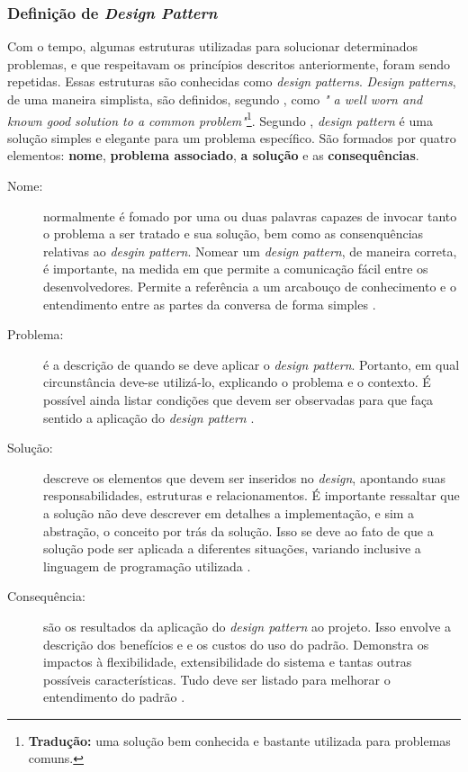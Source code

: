 \subsubsection{Definição de \textit{Design Pattern}}
Com o tempo, algumas estruturas utilizadas para solucionar determinados problemas,
e que respeitavam os princípios descritos anteriormente, foram sendo repetidas.
Essas estruturas são conhecidas como  \textit{design patterns}. \textit{Design patterns},
de uma maneira simplista, são definidos, segundo , como
\textit{" a well worn and known good solution to a common problem"}\footnote{\textbf{Tradução:} uma solução bem conhecida e bastante utilizada para problemas comuns.}. Segundo
, \textit{design pattern} é uma solução simples e
elegante para um problema específico. São formados por quatro elementos: \textbf{nome},
\textbf{problema associado}, \textbf{a solução} e as \textbf{consequências}.
\begin{description}
\item[Nome:] normalmente é fomado por uma ou duas palavras capazes de invocar
tanto o problema a ser tratado e sua solução, bem como as consenquências relativas
ao \textit{desgin pattern}. Nomear um \textit{design pattern}, de maneira correta,
é importante, na medida em que permite a comunicação fácil entre os desenvolvedores.
Permite a referência a um arcabouço de conhecimento e o entendimento entre as
partes da conversa de forma simples \cite{martin2000}.
\item[Problema:] é a descrição de quando se deve aplicar o \textit{design pattern}.
Portanto, em qual circunstância deve-se utilizá-lo, explicando o problema e o contexto.
É possível ainda listar condições que devem ser observadas para que faça sentido a
aplicação do \textit{design pattern} \cite{martin2000}.
\item[Solução:] descreve os elementos que devem ser inseridos no \textit{design},
apontando suas responsabilidades, estruturas e relacionamentos. É importante
ressaltar que a solução não deve descrever em detalhes a implementação, e sim a
abstração, o conceito por trás da solução. Isso se deve ao fato de que a solução
pode ser aplicada a diferentes situações, variando inclusive a linguagem de
programação utilizada \cite{martin2000}.
\item[Consequência:] são os resultados da aplicação do \textit{design pattern}
ao projeto. Isso envolve a descrição dos benefícios e e os custos do uso do padrão.
Demonstra os impactos à flexibilidade, extensibilidade do sistema e tantas outras
possíveis características. Tudo deve ser listado para melhorar o entendimento do
padrão \cite{martin2000}.
\end{description}
\par
